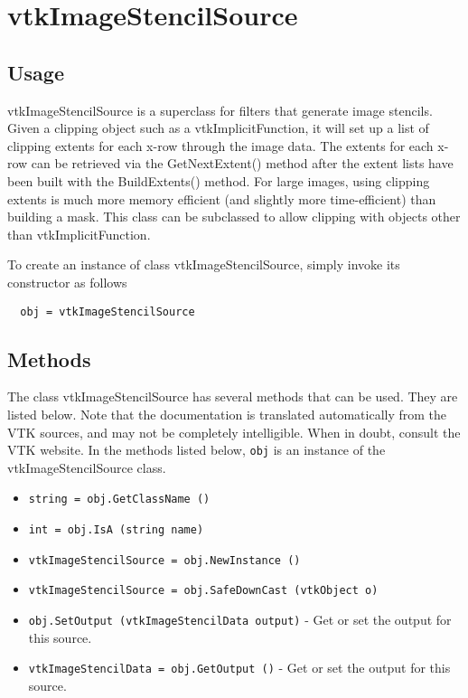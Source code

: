 \section{vtkImageStencilSource}

\subsection{Usage}

 vtkImageStencilSource is a superclass for filters that generate image
 stencils.  Given a clipping object such as a vtkImplicitFunction, it
 will set up a list of clipping extents for each x-row through the
 image data.  The extents for each x-row can be retrieved via the 
 GetNextExtent() method after the extent lists have been built
 with the BuildExtents() method.  For large images, using clipping
 extents is much more memory efficient (and slightly more time-efficient)
 than building a mask.  This class can be subclassed to allow clipping
 with objects other than vtkImplicitFunction.

To create an instance of class vtkImageStencilSource, simply
invoke its constructor as follows
\begin{verbatim}
  obj = vtkImageStencilSource
\end{verbatim}
\subsection{Methods}

The class vtkImageStencilSource has several methods that can be used.
  They are listed below.
Note that the documentation is translated automatically from the VTK sources,
and may not be completely intelligible.  When in doubt, consult the VTK website.
In the methods listed below, \verb|obj| is an instance of the vtkImageStencilSource class.
\begin{itemize}
\item  \verb|string = obj.GetClassName ()|

\item  \verb|int = obj.IsA (string name)|

\item  \verb|vtkImageStencilSource = obj.NewInstance ()|

\item  \verb|vtkImageStencilSource = obj.SafeDownCast (vtkObject o)|

\item  \verb|obj.SetOutput (vtkImageStencilData output)| -  Get or set the output for this source.

\item  \verb|vtkImageStencilData = obj.GetOutput ()| -  Get or set the output for this source.

\end{itemize}
